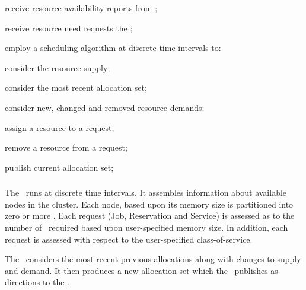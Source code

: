     \begin{description}
      \item receive resource availability reports from \varAgents;
      \item receive resource need requests the \varOrchestrator;
      \item employ a scheduling algorithm at discrete time intervals to:
      \begin{description}
        \item consider the resource supply;
        \item consider the most recent allocation set;
        \item consider new, changed and removed resource demands;
        \item assign a resource to a request;
        \item remove a resource from a request;
        \item publish current allocation set;
      \end{description} 
    \end{description}     
        
    \subsubsection{\varScheduler} 
    
    The \varScheduler~runs at discrete time intervals.
    It assembles information about available nodes in the cluster.
    Each node, based upon its memory size is partitioned into zero or more \varShares.
    Each request (Job, Reservation and Service) is assessed as to the number of
    \varShares~required based upon user-specified memory size. 
    In addition, each request is assessed with respect to the user-specified class-of-service.

    The \varScheduler~considers the most recent previous allocations along with changes
    to supply and demand.  It then produces a new allocation set which the 
    \varResourceManager~publishes as directions to the \varOrchestrator.
    